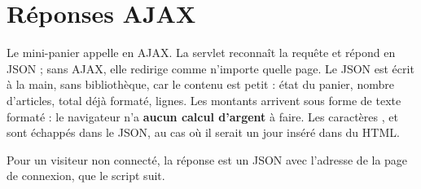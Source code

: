 \section{Réponses AJAX}
Le mini-panier appelle  en AJAX. La servlet reconnaît la requête et répond en JSON ; sans AJAX, elle redirige
comme n'importe quelle page. Le JSON est écrit à la main, sans bibliothèque, car le contenu est petit : état du
panier, nombre d'articles, total déjà formaté, lignes. Les montants arrivent sous forme de texte formaté : le navigateur n'a
\textbf{aucun calcul d'argent} à faire. Les caractères \code{<}, \code{>} et \code{\&} sont échappés dans le JSON, au cas
où il serait un jour inséré dans du HTML.

Pour un visiteur non connecté, la réponse est un JSON  avec l'adresse de la page de connexion,
que le script suit.
